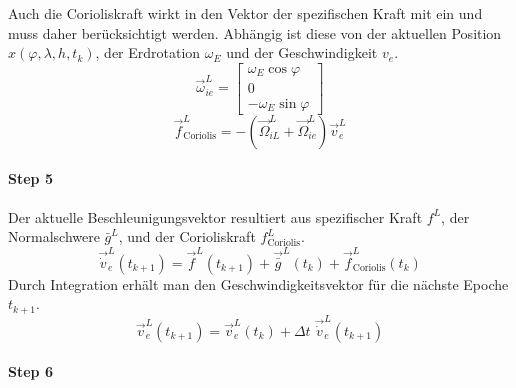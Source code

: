 Auch die Corioliskraft wirkt in den Vektor der spezifischen Kraft mit ein und muss daher berücksichtigt werden. Abhängig ist diese von der aktuellen Position $x(\varphi,\lambda,h,t_k)$, der Erdrotation $\omega_E$ und der Geschwindigkeit $v_e$.
\begin{equation}
	\vec{\omega}_{ie}^L =
		\begin{bmatrix}
			\omega_E \cos \varphi \\ 
 			0 \\ 
			-\omega_E \sin \varphi
		\end{bmatrix}
\end{equation}
\begin{equation}
	\vec{f}_{\text{Coriolis}}^L = - (\vec{\Omega}_{iL}^L+\vec{\Omega}_{ie}^L) \vec{v}_e^L
\end{equation}

\paragraph{Step 5}

Der aktuelle Beschleunigungsvektor resultiert aus spezifischer Kraft $f^L$, der Normalschwere $\bar{g}^L$, und der Corioliskraft $f_{\text{Coriolis}}^L$.
\begin{equation}
	\vec{\dot{v}}_e^L(t_{k+1}) = \vec{f}^L(t_{k+1}) + \vec{\bar{g}}^L(t_k) + \vec{f}_{\text{Coriolis}}^L(t_k)
\end{equation}
Durch Integration erhält man den Geschwindigkeitsvektor für die nächste Epoche $t_{k+1}$.
\begin{equation}
 	\vec{v}_e^L(t_{k+1}) = \vec{v}_e^L(t_k) + \Delta t \; \vec{\dot{v}}_e^L(t_{k+1})  
\end{equation}

\paragraph{Step 6}

